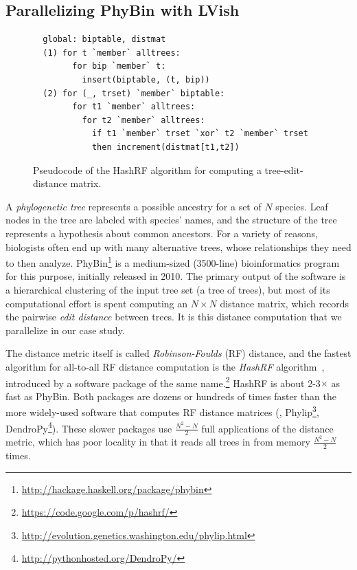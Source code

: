 \subsection{Parallelizing PhyBin with LVish} \label{subsection:lvish-phybin}

\begin{figure}
  \centering
\begin{lstlisting}
  global: biptable, distmat
  (1) for t `member` alltrees:
        for bip `member` t:
          insert(biptable, (t, bip))
  (2) for (_, trset) `member` biptable: 
        for t1 `member` alltrees:
          for t2 `member` alltrees:
            if t1 `member` trset `xor` t2 `member` trset
            then increment(distmat[t1,t2])
\end{lstlisting}  
  \caption{Pseudocode of the HashRF algorithm for computing a tree-edit-distance matrix.}
  \label{f:hashrf-alg}
\end{figure}


A {\em phylogenetic tree} represents a possible ancestry for a set of $N$ species.
Leaf nodes in the tree are labeled with species' names, and the structure of the
tree represents a hypothesis about common ancestors. For a variety of reasons, biologists often end up
with many alternative trees, whose relationships they need to then analyze.
PhyBin\footnote{\url{http://hackage.haskell.org/package/phybin}} is a medium-sized (3500-line)
bioinformatics program for this purpose, initially released in 2010.
%
The primary output of the 
software is a hierarchical clustering of the input tree set (a tree
of trees), but most of its computational effort is spent computing an
$N{\times}N$ 
distance matrix, which records the pairwise 
{\em edit distance} between trees.
It is this distance computation that we parallelize in our case study.

The distance metric itself is called {\em Robinson-Foulds} (RF) distance, and
the fastest algorithm for all-to-all RF distance computation is the {\em HashRF}
algorithm~\cite{hashrf}, introduced by a software package of the same name.\footnote{\url{https://code.google.com/p/hashrf/}}  HashRF is about
2-3$\times$ as fast as PhyBin.  Both packages are dozens or hundreds of times faster
than the more widely-used software that computes RF distance matrices (\eg{}, Phylip\footnote{\url{http://evolution.genetics.washington.edu/phylip.html}}, DendroPy\footnote{\url{http://pythonhosted.org/DendroPy/}}).  These
slower packages use $\frac{N^2-N}{2}$ full applications of the distance metric, which has poor
locality in that it reads all trees in from memory $\frac{N^2-N}{2}$ times.
%

